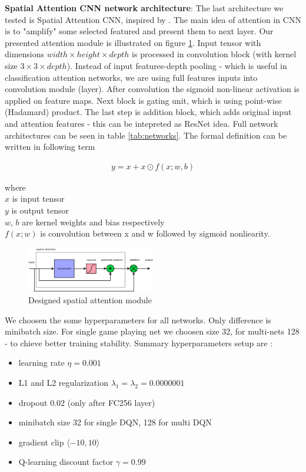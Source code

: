 \documentclass[10pt,a4paper]{article}
\begin{document}
{\bf Spatial Attention CNN network architecture}:
The last architecture we tested is Spatial Attention CNN, inspired by \cite{bib:cbam}.
The main idea of attention in CNN is to "amplify" some selected featured and present them to next layer.
Our presented attention module is illustrated on figure \ref{img:spatial_attention_module}.
Input tensor with dimensions $width \times height \times depth$ is processed in convolution block (with kernel size $3 \times 3 \times depth$).
Instead of input features-depth pooling - which is useful in classification attention networks, we are using full features inputs into convolution module (layer).
After convolution the sigmoid non-linear activation is applied on feature maps. Next block is gating unit, which is using point-wise (Hadamard) product.
The last step is addition block, which adds original input and attention features - this can be intepreted as ResNet idea. Full network architectures can be seen in table \ref{tab:networks}.
The formal definition can be written in following term

\begin{align}
y = x + x \odot f(x; w, b)
\end{align}

where \\
$x$ is input tensor \\
$y$ is output tensor \\
$w$, $b$ are kernel weights and bias respectively \\
$f(x; w)$ is convolution between x and w followed by sigmoid nonliearity.

\begin{figure}[htb!]
\centering
\includegraphics[width=0.5\textwidth]{diagrams/spatial_attention.png}
\caption{Designed spatial attention module}
\label{img:spatial_attention_module}
\end{figure}

We choosen the some hyperparameters for all networks. Only difference is minibatch size. For single game playing net we choosen size 32, for multi-nets 128 - to chieve better
training stability. Summary hyperparameters setup are :
\begin{itemize}
    \item learning rate $\eta = 0.001$
    \item L1 and L2 regularization $\lambda _1 = \lambda _2 = 0.0000001$
    \item dropout $0.02$ (only after FC256 layer)
    \item minibatch size 32 for single DQN, 128 for multi DQN
    \item gradient clip $\langle -10, 10 \rangle$
    \item Q-learning discount factor $\gamma = 0.99$
\end{itemize}
\end{document}
